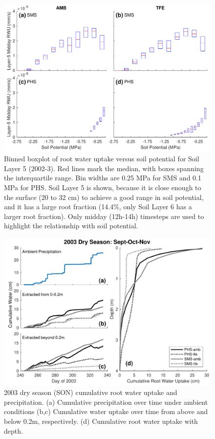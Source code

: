 \documentclass[draft,linenumbers]{agujournal}
\begin{document}
  \begin{figure}[h]
     \centering
     \includegraphics[width=30pc]{../figs3/rwu.pdf}
     \caption{Binned boxplot of root water uptake versus soil potential for Soil Layer 5 (2002-3).
     Red lines mark the median, with boxes spanning the interquartile range.
     Bin widths are 0.25 MPa for SMS and 0.1 MPa for PHS.
     Soil Layer 5 is shown, because it is close enough to the surface (20 to 32 cm) to achieve a good range in soil potential, and it has a large root fraction (14.4\%, only Soil Layer 6 has a larger root fraction).
     Only midday (12h-14h) timesteps are used to highlight the relationship with soil potential.}
     \label{fig:rwu}
  \end{figure}
  \clearpage
  

        \clearpage
    \begin{figure}[h]
     \centering
     \includegraphics[width=30pc]{../figs3/qdry.pdf}
     \caption{2003 dry season (SON) cumulative root water uptake and precipitation. 
     (a) Cumulative precipitation over time under ambient conditions
     (b,c) Cumulative water uptake over time from above and below 0.2m, respectively.
     (d) Cumulative root water uptake with depth.
     }
     \label{fig:qdry}
  \end{figure}
  
\end{document}
